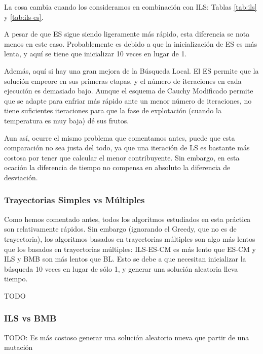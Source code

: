 \documentclass{article}
\begin{document}
La cosa cambia cuando los consideramos en combinación con ILS: Tablas \ref{tab:ils} y \ref{tab:ils-es}.

A pesar de que ES sigue siendo ligeramente más rápido, esta diferencia se nota menos en este caso. Probablemente es debido
a que la inicialización de ES es más lenta, y aquí se tiene que inicializar 10 veces en lugar de 1.

Además, aquí si hay una gran mejora de la Búsqueda Local. El ES permite que la solución empeore en sus primeras etapas, y el
número de iteraciones en cada ejecución es demasiado bajo. Aunque el esquema de Cauchy Modificado permite que se adapte para
enfriar más rápido ante un menor número de iteraciones, no tiene suficientes iteraciones para que la fase de explotación
(cuando la temperatura es muy baja) dé sus frutos.

Aun así, ocurre el mismo problema que comentamos antes, puede que esta
comparación no sea justa del todo, ya que una iteración de LS es bastante más costosa por tener que calcular el menor contribuyente. Sin embargo, en esta ocación la diferencia de tiempo no compensa en absoluto la diferencia de desviación.

\subsubsection*{Trayectorias Simples vs Múltiples}

Como hemos comentado antes, todos los algoritmos estudiados en esta práctica son relativamente rápidos. Sin embargo
(ignorando el Greedy, que no es de trayectoria), los algoritmos basados en trayectorias múltiples son algo más lentos
que los basados en trayectorias múltiples: ILS-ES-CM es más lento que ES-CM y ILS y BMB son más lentos que BL. Esto
se debe a que necesitan inicializar la búsqueda 10 veces en lugar de sólo 1, y generar una solución aleatoria lleva tiempo.

TODO

\subsubsection*{ILS vs BMB}

TODO: Es más costoso generar una solución aleatorio nueva que partir de una mutación
\end{document}
